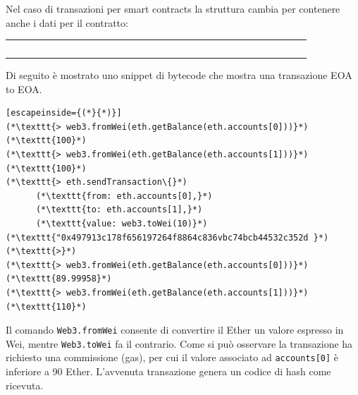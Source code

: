 Nel caso di transazioni per smart contracts la struttura cambia per contenere anche i dati per il contratto:

\begin{table}[htb!]
\centering
\begin{tabular}{lllll}
{\cellcolor[rgb]{1,0.635,0}}~ ~\textcolor{white}{from~ ~} & {\cellcolor[rgb]{1,0,0.408}}~\textcolor{white}{signature~} & {\cellcolor[rgb]{0.827,0,1}}~ ~ \textcolor{white}{to~ ~~} & {\cellcolor[rgb]{0.012,0.384,0.988}}~ ~\textcolor{white}{amount~ ~} & {\cellcolor[rgb]{0,0.502,0.502}}\textcolor{white}{~ ~ data~ ~~} 
\end{tabular}
\end{table}

Di seguito è mostrato uno snippet di bytecode che  mostra una transazione EOA to EOA.

\begin{lstlisting}[escapeinside={(*}{*)}]
(*\texttt{> web3.fromWei(eth.getBalance(eth.accounts[0]))}*)
(*\texttt{100}*)
(*\texttt{> web3.fromWei(eth.getBalance(eth.accounts[1]))}*)
(*\texttt{100}*)
(*\texttt{> eth.sendTransaction\{}*)
      (*\texttt{from: eth.accounts[0],}*)
      (*\texttt{to: eth.accounts[1],}*)
      (*\texttt{value: web3.toWei(10)}*)
(*\texttt{"0x497913c178f656197264f8864c836vbc74bcb44532c352d }*)
(*\texttt{>}*)
(*\texttt{> web3.fromWei(eth.getBalance(eth.accounts[0]))}*)
(*\texttt{89.99958}*)
(*\texttt{> web3.fromWei(eth.getBalance(eth.accounts[1]))}*)
(*\texttt{110}*)
\end{lstlisting}

Il comando \texttt{Web3.fromWei} consente di convertire il Ether un valore espresso in Wei, mentre \texttt{Web3.toWei} fa il contrario. Come si può osservare la transazione ha richiesto una commissione (gas), per cui il valore associato ad \texttt{accounts[0]} è inferiore a 90 Ether. L'avvenuta transazione genera un codice di hash come ricevuta.




